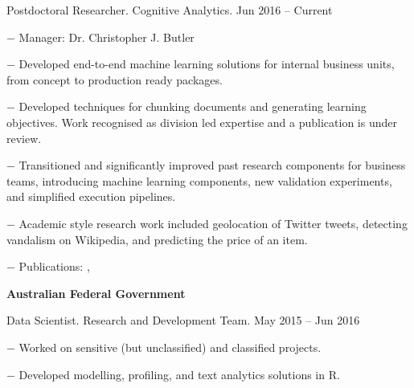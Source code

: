 \documentclass[10pt]{article}
\newcommand{\halfblankline}{\quad\vspace{-0.5\baselineskip}\pagebreak[3]}
\begin{document}
\begin{innerlist}
	\item Postdoctoral Researcher. Cognitive Analytics. \hfill {Jun 2016 -- Current}
	\begin{innerlist}
		\item[$-$] Manager: Dr. Christopher J. Butler
		\item[$-$] Developed end-to-end machine learning solutions for internal business units, from concept to production ready packages.
		\item[$-$] Developed techniques for chunking documents and generating learning objectives. Work recognised as division led expertise and a publication is under review.
		\item[$-$] Transitioned and significantly improved past research components for business teams, introducing machine learning components, new validation experiments, and simplified execution pipelines.
		\item[$-$] Academic style research work included geolocation of Twitter tweets, detecting vandalism on Wikipedia, and predicting the price of an item.
		\item[$-$] Publications: \cite{Lau2017}, \cite{Tran2018}
    \end{innerlist}
\end{innerlist}

		
\halfblankline

\halfblankline

\textbf{Australian Federal Government}

\halfblankline

\begin{innerlist}
	\item Data Scientist. Research and Development Team. \hfill {May 2015 -- Jun 2016}
	\begin{innerlist}
		\item[$-$] Worked on sensitive (but unclassified) and classified projects.
		\item[$-$] Developed modelling, profiling, and text analytics solutions in R.
    \end{innerlist}
\end{innerlist}
\end{document}
